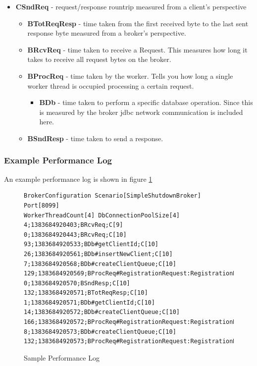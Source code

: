 \documentclass[a4paper]{article}
\begin{document}
\begin{itemize}
\item \textbf{CSndReq} - request/response rountrip measured from a client's perspective 
	\begin{itemize}
	\item \textbf{BTotReqResp} - time taken from the first received byte to the last sent response byte measured from a broker's perspective.
	\item \textbf{BRcvReq} - time taken to receive a Request. This measures how long it takes to receive all request bytes on the broker.
	\item \textbf{BProcReq} - time taken by the worker. Tells you how long a single worker thread is occupied processing a certain request.
		\begin{itemize}
   		\item \textbf{BDb} - time taken to perform a specific database operation. Since this is measured by the broker jdbc network communication is included here.
   		\end{itemize}
	\item \textbf{BSndResp} - time taken to send a response.
	\end{itemize}
\end{itemize}

\subsubsection{Example Performance Log}
An example performance log is shown in figure \ref{fig:sample-perf-log}

\begin{figure}[H]
  \begin{center}
	\begin{verbatim}
BrokerConfiguration Scenario[SimpleShutdownBroker] Port[8099] 
WorkerThreadCount[4] DbConnectionPoolSize[4]
4;1383684920403;BRcvReq;C[9]
0;1383684920443;BRcvReq;C[10]
93;1383684920533;BDb#getClientId;C[10]
26;1383684920561;BDb#insertNewClient;C[10]
7;1383684920568;BDb#createClientQueue;C[10]
129;1383684920569;BProcReq#RegistrationRequest:RegistrationResponse;C[10]
0;1383684920570;BSndResp;C[10]
132;1383684920571;BTotReqResp;C[10]
1;1383684920571;BDb#getClientId;C[10]
14;1383684920572;BDb#createClientQueue;C[10]
166;1383684920572;BProcReq#RegistrationRequest:RegistrationResponse;C[10]
8;1383684920573;BDb#createClientQueue;C[10]
132;1383684920573;BProcReq#RegistrationRequest:RegistrationResponse;C[10]
	\end{verbatim}
  \end{center}
  \caption{Sample Performance Log}
  \label{fig:sample-perf-log}
\end{figure}
\end{document}
